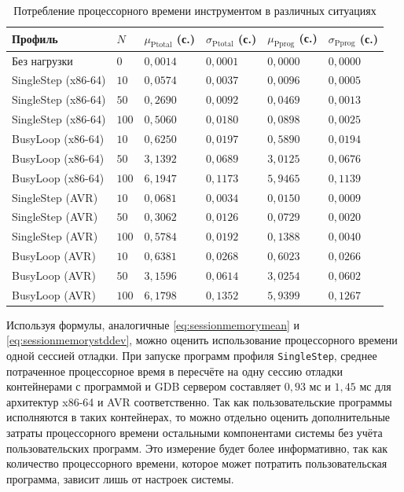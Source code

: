 \documentclass[a4paper,article,14pt]{extarticle}
\begin{document}
\begin{table}[ht]
\small
    \begin{tabular}{p{3.4cm}p{1cm}p{2.4cm}p{2.4cm}p{2.4cm}p{2.4cm}}
    \toprule
    Профиль & $N$ & $\mu_\mathrm{Ptotal}$ (с.) & $\sigma_\mathrm{Ptotal}$ (с.) &
    $\mu_\mathrm{Pprog}$ (с.) & $\sigma_\mathrm{Pprog}$ (с.) \\
    \midrule
Без нагрузки & $0$ & $0{,}0014$ & $0{,}0001$ & $0{,}0000$ & $0{,}0000$ \\
SingleStep (x86-64) & $10$ & $0{,}0574$ & $0{,}0037$ & $0{,}0096$ & $0{,}0005$ \\
SingleStep (x86-64) & $50$ & $0{,}2690$ & $0{,}0092$ & $0{,}0469$ & $0{,}0013$ \\
SingleStep (x86-64) & $100$ & $0{,}5060$ & $0{,}0180$ & $0{,}0898$ & $0{,}0025$ \\
BusyLoop (x86-64) & $10$ & $0{,}6250$ & $0{,}0197$ & $0{,}5890$ & $0{,}0194$ \\
BusyLoop (x86-64) & $50$ & $3{,}1392$ & $0{,}0689$ & $3{,}0125$ & $0{,}0676$ \\
BusyLoop (x86-64) & $100$ & $6{,}1947$ & $0{,}1173$ & $5{,}9465$ & $0{,}1139$ \\
SingleStep (AVR) & $10$ & $0{,}0681$ & $0{,}0034$ & $0{,}0150$ & $0{,}0009$ \\
SingleStep (AVR) & $50$ & $0{,}3062$ & $0{,}0126$ & $0{,}0729$ & $0{,}0020$ \\
SingleStep (AVR) & $100$ & $0{,}5784$ & $0{,}0192$ & $0{,}1388$ & $0{,}0040$ \\
BusyLoop (AVR) & $10$ & $0{,}6381$ & $0{,}0268$ & $0{,}6023$ & $0{,}0266$ \\
BusyLoop (AVR) & $50$ & $3{,}1596$ & $0{,}0614$ & $3{,}0254$ & $0{,}0602$ \\
BusyLoop (AVR) & $100$ & $6{,}1798$ & $0{,}1352$ & $5{,}9399$ & $0{,}1267$ \\
\bottomrule
    \end{tabular}
\caption{\label{table:cpumeasurements}Потребление процессорного времени инструментом в различных ситуациях}
\normalsize
\end{table}

Используя формулы, аналогичные \ref{eq:sessionmemorymean} и \ref{eq:sessionmemorystddev}, можно оценить использование процессорного времени одной сессией отладки. При запуске программ профиля \texttt{SingleStep}, среднее потраченное процессорное время в пересчёте на одну сессию отладки контейнерами с программой и GDB сервером составляет $0{,}93$ мс и $1{,}45$ мс для архитектур x86-64 и AVR соответственно. Так как пользовательские программы исполняются в таких контейнерах, то можно отдельно оценить дополнительные затраты процессорного времени остальными компонентами системы без учёта пользовательских программ. Это измерение будет более информативно, так как количество процессорного времени, которое может потратить пользовательская программа, зависит лишь от настроек системы.
\end{document}

